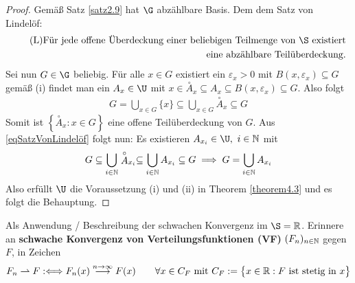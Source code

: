 \begin{proof}
Gemäß Satz \ref{satz2.9} hat $\G$ abzählbare Basis. Dem dem Satz von Lindelöf:
\begin{align}\label{eqSatzVonLindelöf}\tag{L}
\text{Für jede offene Überdeckung einer beliebigen Teilmenge von $\S$ existiert}\\\nonumber\text{eine abzählbare Teilüberdeckung.}
\end{align}
Sei nun $G\in\G$ beliebig. Für alle $x\in G$ existiert ein $\varepsilon_x>0$ mit $B(x,\varepsilon_x)\subseteq G$ gemäß (i) findet man ein $A_x\in\U$ mit $x\in\stackrel{\circ}{A}_x\subseteq A_x\subseteq B(x,\varepsilon_x)\subseteq G$. Also folgt
\begin{align*}
G=\bigcup\limits_{x\in G}\lbrace x\rbrace\subseteq\bigcup\limits_{x\in G}\stackrel{\circ}{A}_x\subseteq G
\end{align*}
Somit ist $\left\lbrace\stackrel{\circ}{A}_x:x\in G\right\rbrace$ eine offene Teilüberdeckung von $G$. Aus \eqref{eqSatzVonLindelöf} folgt nun: Es existieren $A_{x_i}\in\U,~i\in\N$ mit
\begin{align*}
G\subseteq\bigcup\limits_{i\in\mathbb{N}}\stackrel{\circ}{A}_{x_i}\subseteq 
\bigcup\limits_{i\in\mathbb{N}}A_{x_i}\subseteq 
G
\implies
G=\bigcup\limits_{i\in\mathbb{N}}A_{x_i}
\end{align*}
Also erfüllt $\U$ die Voraussetzung (i) und (ii) in Theorem \ref{theorem4.3} und es folgt die Behauptung.
\end{proof}

Als Anwendung / Beschreibung der schwachen Konvergenz im $\S=\R$. Erinnere an \textbf{schwache Konvergenz von Verteilungsfunktionen (VF)} $(F_n)_{n\in\mathbb{N}}$ gegen $F$, in Zeichen
\begin{align*}
F_n\rightharpoonup F
:\Longleftrightarrow
F_n(x)\stackrel{n\to\infty}{\longrightarrow} F(x)\qquad\forall x\in C_F
\text{ mit } C_F:=\big\lbrace x\in\mathbb{R}:F\text{ ist stetig in }x\big\rbrace
\end{align*}

